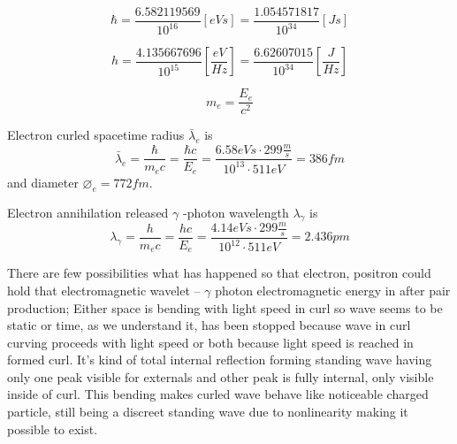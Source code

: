 \begin{equation} \label{eq:reduced_plank_constant} 
	\hbar
	= \frac{6.582119569}{10^{16}}[eVs]
	= \frac{1.054571817}{10^{34}}[Js]
\end{equation}

\begin{equation} \label{eq:plank_constant} %
	h
	= \frac{4.135667696}{10^{15}}\left[\frac{eV}{Hz}\right]
	= \frac{6.62607015}{10^{34}}\left[\frac{J}{Hz}\right]
\end{equation}

\begin{equation} \label{eq:electron_rest_mass}
	m_e=\frac{E_e}{c^2}
\end{equation}

Electron curled spacetime radius $\bar{\lambda}_e$ is
\begin{equation} \label{eq:gamma_lenght}
 \bar{\lambda}_e=\frac{\hbar}{m_ec}
 =\frac{\hbar c}{E_e}
 =\frac{6.58eVs\cdot299\frac{m}{s}}{10^{13}\cdot511eV}
 =386fm
\end{equation}
and diameter $\diameter_e=772 fm$.


Electron annihilation released $\gamma$ -photon wavelength $\lambda_\gamma$ is
\begin{equation} \label{eq:gamma_lenght}
 \lambda_\gamma=\frac{h}{m_ec}
 =\frac{hc}{E_e}
 =\frac{4.14eVs\cdot299\frac{m}{s}}{10^{12}\cdot511eV}
 =2.436pm
\end{equation}

There are few possibilities what has happened so that electron, pos\-i\-tron
could hold that electromagnetic wavelet -- $\gamma$ photon electromagnetic
energy in after pair production; Either space is bending with light speed in
curl so wave seems to be static or time, as we understand it, has been stopped
because wave in curl curving proceeds with light speed or both because light
speed is reached in formed curl. It's kind of total internal reflection
forming standing wave having only one peak visible for externals and other
peak is fully internal, only visible inside of curl. This bending makes curled
wave behave like noticeable charged particle, still being a discreet standing
wave due to nonlinearity making it possible to exist.

